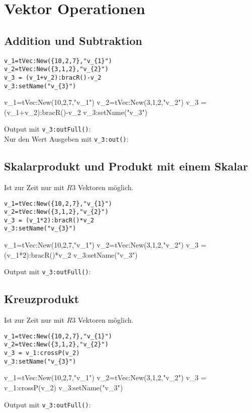 \section{Vektor Operationen}
\subsection{Addition und Subtraktion}
\begin{lstlisting}
v_1=tVec:New({10,2,7},"v_{1}")
v_2=tVec:New({3,1,2},"v_{2}")
v_3 = (v_1+v_2):bracR()-v_2
v_3:setName("v_{3}")
\end{lstlisting}
\begin{luacode*}
	v_1=tVec:New({10,2,7},"v_{1}")
	v_2=tVec:New({3,1,2},"v_{2}")
	v_3 = (v_1+v_2):bracR()-v_2
	v_3:setName("v_{3}")
\end{luacode*}
Output mit \lstinline{v_3:outFull()}:
 \\
Nur den Wert Ausgeben mit \lstinline{v_3:out()}:
\subsection{Skalarprodukt und Produkt mit einem Skalar}
Ist zur Zeit nur mit $R3$ Vektoren möglich.
\begin{lstlisting}
v_1=tVec:New({10,2,7},"v_{1}")
v_2=tVec:New({3,1,2},"v_{2}")
v_3 = (v_1*2):bracR()*v_2
v_3:setName("v_{3}")
\end{lstlisting}
\begin{luacode*}
	v_1=tVec:New({10,2,7},"v_{1}")
	v_2=tVec:New({3,1,2},"v_{2}")
	v_3 = (v_1*2):bracR()*v_2
	v_3:setName("v_{3}")
\end{luacode*}
Output mit \lstinline{v_3:outFull()}:
\subsection{Kreuzprodukt}
Ist zur Zeit nur mit $R3$ Vektoren möglich.
\begin{lstlisting}
v_1=tVec:New({10,2,7},"v_{1}")
v_2=tVec:New({3,1,2},"v_{2}")
v_3 = v_1:crossP(v_2)
v_3:setName("v_{3}")
\end{lstlisting}
\begin{luacode*}
	v_1=tVec:New({10,2,7},"v_{1}")
	v_2=tVec:New({3,1,2},"v_{2}")
	v_3 = v_1:crossP(v_2)
	v_3:setName("v_{3}")
\end{luacode*}
Output mit \lstinline{v_3:outFull()}:
\newpage
